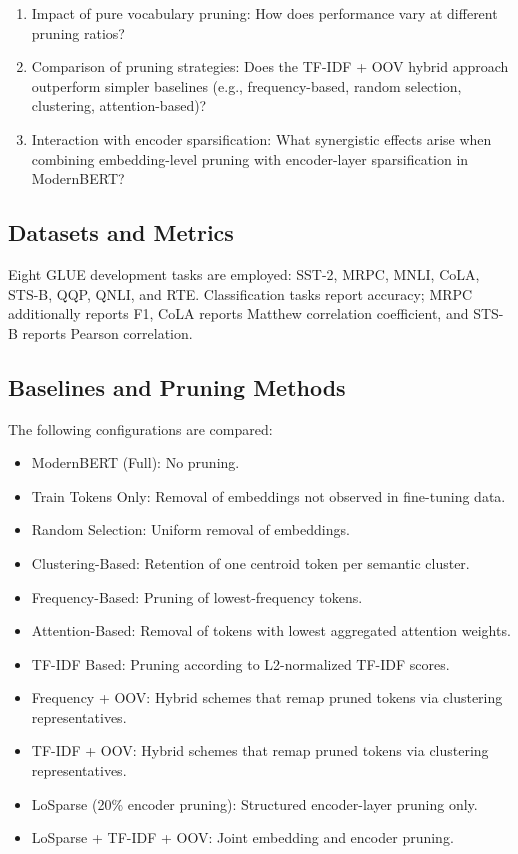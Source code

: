 \documentclass[twocolumn]{article}
\begin{document}
\begin{enumerate}
    \item Impact of pure vocabulary pruning: How does performance vary at different pruning ratios?
    \item Comparison of pruning strategies: Does the TF-IDF + OOV hybrid approach outperform simpler baselines (e.g., frequency-based, random selection, clustering, attention-based)?
    \item Interaction with encoder sparsification: What synergistic effects arise when combining embedding-level pruning with encoder-layer sparsification in ModernBERT?
\end{enumerate}

\subsection{Datasets and Metrics}
Eight GLUE development tasks are employed: SST-2, MRPC, MNLI, CoLA, STS-B, QQP, QNLI, and RTE. Classification tasks report accuracy; MRPC additionally reports F1, CoLA reports Matthew correlation coefficient, and STS-B reports Pearson correlation.

\subsection{Baselines and Pruning Methods}
The following configurations are compared:

\begin{itemize}
    \item ModernBERT (Full): No pruning.
    \item Train Tokens Only: Removal of embeddings not observed in fine-tuning data.
    \item Random Selection: Uniform removal of embeddings.
    \item Clustering-Based: Retention of one centroid token per semantic cluster.
    \item Frequency-Based: Pruning of lowest-frequency tokens.
    \item Attention-Based: Removal of tokens with lowest aggregated attention weights.
    \item TF-IDF Based: Pruning according to L2-normalized TF-IDF scores.
    \item Frequency + OOV: Hybrid schemes that remap pruned tokens via clustering representatives.
    \item TF-IDF + OOV: Hybrid schemes that remap pruned tokens via clustering representatives.
    \item LoSparse (20\% encoder pruning): Structured encoder-layer pruning only.
    \item LoSparse + TF-IDF + OOV: Joint embedding and encoder pruning.
\end{itemize}
\end{document}

